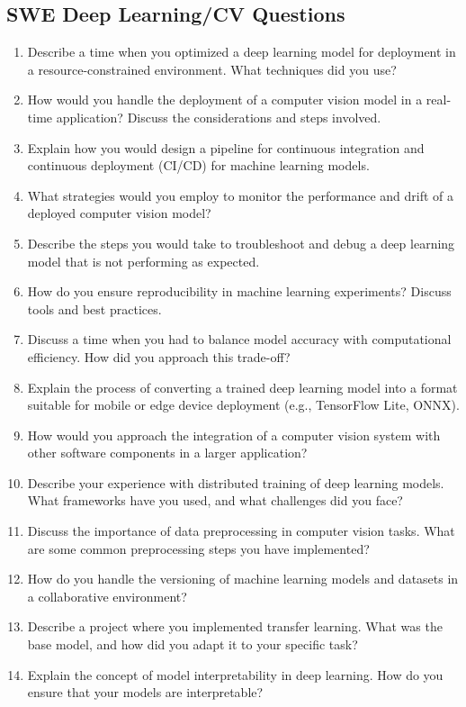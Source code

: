 \documentclass[12pt]{article}
\begin{document}
\subsection{SWE Deep Learning/CV Questions}
\begin{enumerate}
    \item Describe a time when you optimized a deep learning model for deployment in a resource-constrained environment. What techniques did you use?
    \item How would you handle the deployment of a computer vision model in a real-time application? Discuss the considerations and steps involved.
    \item Explain how you would design a pipeline for continuous integration and continuous deployment (CI/CD) for machine learning models.
    \item What strategies would you employ to monitor the performance and drift of a deployed computer vision model?
    \item Describe the steps you would take to troubleshoot and debug a deep learning model that is not performing as expected.
    \item How do you ensure reproducibility in machine learning experiments? Discuss tools and best practices.
    \item Discuss a time when you had to balance model accuracy with computational efficiency. How did you approach this trade-off?
    \item Explain the process of converting a trained deep learning model into a format suitable for mobile or edge device deployment (e.g., TensorFlow Lite, ONNX).
    \item How would you approach the integration of a computer vision system with other software components in a larger application?
    \item Describe your experience with distributed training of deep learning models. What frameworks have you used, and what challenges did you face?
    \item Discuss the importance of data preprocessing in computer vision tasks. What are some common preprocessing steps you have implemented?
    \item How do you handle the versioning of machine learning models and datasets in a collaborative environment?
    \item Describe a project where you implemented transfer learning. What was the base model, and how did you adapt it to your specific task?
    \item Explain the concept of model interpretability in deep learning. How do you ensure that your models are interpretable?

\end{enumerate}
\end{document}
